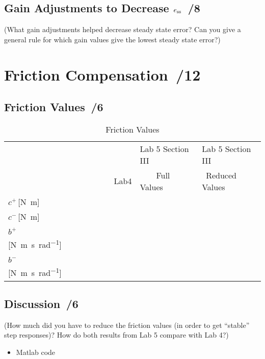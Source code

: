 \documentclass{article}
\newcommand{\score}{\hfill \underline{\hspace{0.65cm}}\,/} %
\begin{document}
\subsection{Gain Adjustments to Decrease $e_{\rm ss}$ \score 8}
(What gain adjustments helped decrease steady state error? Can you give a general rule for which gain values give the lowest steady state error?)

\section{Friction Compensation \score 12}
\subsection{Friction Values \score 6}
\begin{table}[phtb]\footnotesize
\begin{center}
\caption{Friction Values}
 \label{tbl:lab5_q4}
\begin{tabular}{l|m{2.5cm}|m{2.5cm}|m{2.5cm}} \hline \hline
\cellcolor{lightgray} &\cellcolor{lightgray}  &\cellcolor{lightgray} Lab 5 Section III & \cellcolor{lightgray} Lab 5 Section III \\
\cellcolor{lightgray}&\multirow{-2}{*}{\cellcolor{lightgray}~~~~~~~~~Lab4} & \cellcolor{lightgray}~~~~Full Values &\cellcolor{lightgray} ~Reduced Values \\
\hline
$c^+$\,[\si{\newton\meter}] & & &  \\ \hline
$c^-$\,[\si{\newton\meter}] & & &  \\ \hline
$b^+$\,[\si{\newton\meter\second\per\radian}] & & & \\ \hline
$b^-$\,[\si{\newton\meter\second\per\radian}] & & & \\ \hline
\end{tabular}
\end{center}
\end{table}

\subsection{Discussion \score 6}
(How much did you have to reduce the friction values (in order to get ``stable'' step responses)? How do both results from Lab 5 compare with Lab 4?)
\newline \\[3mm]
\begin{itemize}
\item {\sc Matlab} code  
\end{itemize}
\end{document}
